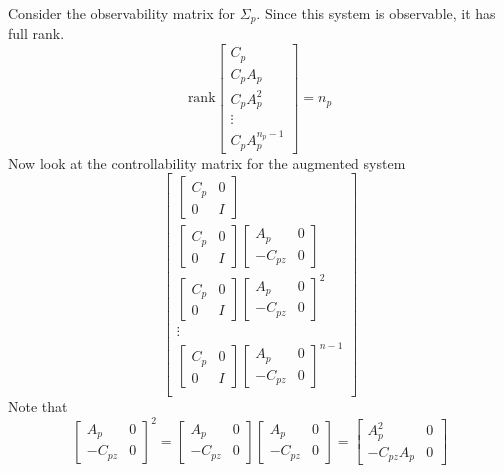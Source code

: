 Consider the observability matrix for $\Sigma_{p}$.
Since this system is observable, it has full rank.
\begin{equation*}
  \text{rank}
  \begin{bmatrix}
    C_{p} \\
    C_{p}A_{p} \\
    C_{p}A_{p}^{2} \\
    \vdots \\
    C_{p}A_{p}^{n_{p}-1}
  \end{bmatrix}
  =n_{p}
\end{equation*}
Now look at the controllability matrix for the augmented system
\begin{equation*}
  \begin{bmatrix}
    \begin{bmatrix}
      C_{p} & 0 \\
      0 & I
    \end{bmatrix} \\
    \begin{bmatrix}
      C_{p} & 0 \\
      0 & I
    \end{bmatrix}
    \begin{bmatrix}
      A_{p} & 0 \\
      -C_{pz} & 0
    \end{bmatrix} \\
    \begin{bmatrix}
      C_{p} & 0 \\
      0 & I
    \end{bmatrix}
    \begin{bmatrix}
      A_{p} & 0 \\
      -C_{pz} & 0
    \end{bmatrix}^{2} \\
    \vdots \\
    \begin{bmatrix}
      C_{p} & 0 \\
      0 & I
    \end{bmatrix}
    \begin{bmatrix}
      A_{p} & 0 \\
      -C_{pz} & 0
    \end{bmatrix}^{n-1} \\
  \end{bmatrix}
\end{equation*}
Note that
\begin{equation*}
  \begin{bmatrix}
    A_{p} & 0 \\
    -C_{pz} & 0
  \end{bmatrix}^{2}=
  \begin{bmatrix}
    A_{p} & 0 \\
    -C_{pz} & 0
  \end{bmatrix}
  \begin{bmatrix}
    A_{p} & 0 \\
    -C_{pz} & 0
  \end{bmatrix}=
  \begin{bmatrix}
    A_{p}^{2} & 0 \\
    -C_{pz}A_{p} & 0
  \end{bmatrix}
\end{equation*}
